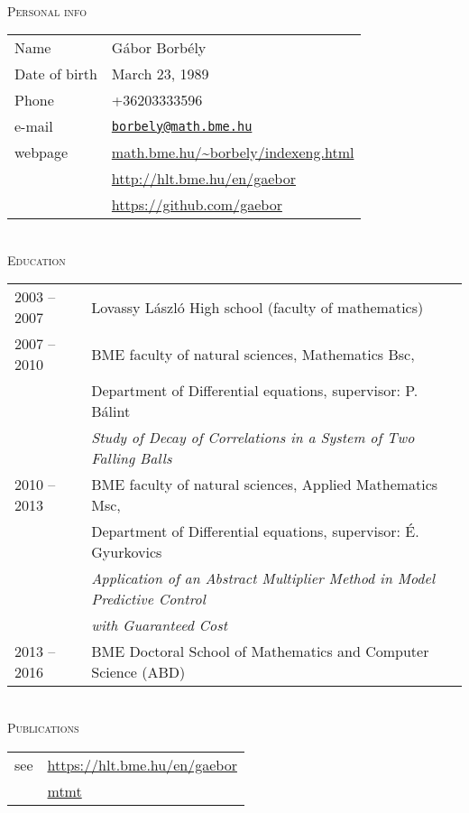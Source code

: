 \documentclass[12pt]{article}
\newcommand\mail[1]{\href{mailto:#1}{\texttt{#1}}}
\begin{document}
{ \ }
\\
\textsc{Personal info}
 \vspace{0.3cm}
 \\
       \begin{tabular}{p{3cm}l}
	       Name & Gábor Borbély\\
           Date of birth & March 23, 1989\\
		   Phone &  +36203333596\\
		   e-mail & \mail{borbely@math.bme.hu}\\
		   webpage& \url{math.bme.hu/~borbely/indexeng.html} \\
                  & \url{http://hlt.bme.hu/en/gaebor} \\
                  & \url{https://github.com/gaebor}
       \end{tabular}
 \vspace{0.3cm}
 \\
 \textsc{Education}
 \vspace{0.3cm}
 \\
       \begin{tabular}{p{3cm}l}
	       2003 -- 2007 & Lovassy László High school (faculty of mathematics) \\
           2007 -- 2010& BME faculty of natural sciences, Mathematics Bsc, \\
		              & Department of Differential equations, supervisor: P. Bálint\\
					  & \emph{Study of Decay of Correlations in a System of Two Falling Balls} \\
		   2010 -- 2013 & BME faculty of natural sciences, Applied Mathematics Msc,\\
						& Department of Differential equations, supervisor: É. Gyurkovics\\
						& \emph{Application of an Abstract Multiplier Method in Model Predictive Control}\\ & \emph{ with Guaranteed Cost} \\
		    2013 -- 2016 & BME Doctoral School of Mathematics and Computer Science (ABD)
       \end{tabular}
 \vspace{0.3cm}
 \\
 \textsc{Publications}
 \vspace{0.3cm}
 \\
        \begin{tabular}{p{3cm}l}
	       see & \url{https://hlt.bme.hu/en/gaebor} \\ 
               &  \href{https://m2.mtmt.hu/gui2/?type=authors&mode=browse&sel=10043154}{mtmt}
       \end{tabular}
\end{document}
